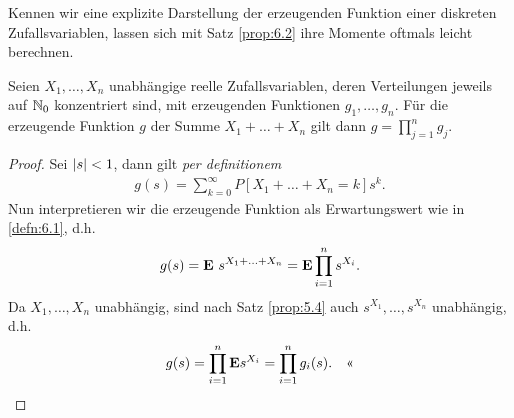 Kennen wir eine explizite Darstellung der erzeugenden Funktion einer diskreten
Zufallsvariablen, lassen sich mit Satz \ref{prop:6.2} ihre Momente oftmals
leicht berechnen.

\begin{prop}
\label{prop:6.3}
Seien $X_{1},\ldots,X_{n}$ unabhängige reelle Zufallsvariablen, deren
Verteilungen jeweils auf $\mathbb{N}_{0}$ konzentriert sind, mit erzeugenden
Funktionen $g_{1},\ldots,g_{n}$. Für die erzeugende Funktion $g$ der Summe
$X_{1}+\ldots+X_{n}$ gilt dann $g=\prod^ {n}_{j=1}g_{j}$.\fishhere
\end{prop}

\begin{proof}
Sei $\left|s\right|<1$, dann gilt \textit{per definitionem}
\begin{align*}
g(s) = \sum\limits_{k=0}^\infty P[X_1+\ldots+X_n=k]s^k.
\end{align*}
Nun interpretieren wir die erzeugende Funktion als Erwartungswert wie in
\ref{defn:6.1}, d.h.
\begin{align*}
g(s) = \textbf{E}\ s^{X_1+\ldots+X_n}
= \textbf{E}\prod\limits_{i=1}^n s^{X_i}.
\end{align*}
Da $X_1,\ldots,X_n$ unabhängig, sind nach Satz \ref{prop:5.4} auch
$s^{X_1},\ldots,s^{X_n}$ unabhängig, d.h.
\begin{align*}
g(s) = \prod\limits_{i=1}^n\textbf{E} s^{X_i} = \prod\limits_{i=1}^n g_i(s).\quad\text{<<}
\end{align*}
\end{proof}

